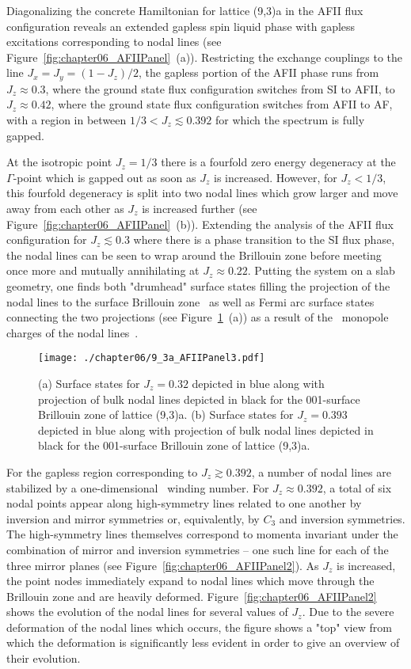Diagonalizing the concrete Hamiltonian for lattice (9,3)a in the AFII flux configuration reveals an extended gapless spin liquid phase with gapless excitations corresponding to nodal lines (see Figure~\ref{fig:chapter06_AFIIPanel}~(a)).
Restricting the exchange couplings to the line $J_x = J_y = (1 - J_z)/2$, the gapless portion of the AFII phase runs from $J_z \approx 0.3$, where the ground state flux configuration switches from SI to AFII, to $J_z \approx 0.42$, where the  ground state flux configuration switches from AFII to AF, with a region in between $1/3 < J_z \lesssim 0.392$ for which the spectrum is fully gapped.

At the isotropic point $J_z = 1/3$ there is a fourfold zero energy degeneracy at the $\Gamma$-point which is gapped out as soon as $J_z$ is increased.
However, for $J_z < 1/3$, this fourfold degeneracy is split into two nodal lines which grow larger and move away from each other as $J_z$ is increased further (see Figure~\ref{fig:chapter06_AFIIPanel}~(b)).
Extending the analysis of the AFII flux configuration for $J_z \lesssim 0.3$ where there is a phase transition to the SI flux phase, the nodal lines can be seen to wrap around the Brillouin zone before meeting once more and mutually annihilating at $J_z \approx 0.22$.
Putting the system on a slab geometry, one finds both "drumhead" surface states filling the projection of the nodal lines to the surface Brillouin zone~\cite{ChenNatComm2015,MullenPRL2015} as well as Fermi arc surface states connecting the two projections (see Figure~\ref{fig:chapter06_AFIIPanel3}~(a)) as a result of the \ZZ~monopole charges of the nodal lines~\cite{GorbarPRB2015a,GorbarPRB2015b}.
%
\begin{figure}[tb]
	\centering
	\texttt{[image: ./chapter06/9\_3a\_AFIIPanel3.pdf]}
	\caption{
		(a) Surface states for $J_z = 0.32$ depicted in blue along with projection of bulk nodal lines depicted in black for the 001-surface Brillouin zone of lattice (9,3)a.
		(b) Surface states for $J_z = 0.393$ depicted in blue along with projection of bulk nodal lines depicted in black for the 001-surface Brillouin zone of lattice (9,3)a.
	}
	\label{fig:chapter06_AFIIPanel3}
\end{figure}
%

For the gapless region corresponding to $J_z \gtrsim 0.392$, a number of nodal lines are stabilized by a one-dimensional \ZZ~winding number.
For $J_z \approx 0.392$, a total of six nodal points appear along high-symmetry lines related to one another by inversion and mirror symmetries or, equivalently, by $C_3$ and inversion symmetries.
The high-symmetry lines themselves correspond to momenta invariant under the combination of mirror and inversion symmetries -- one such line for each of the three mirror planes (see Figure~\ref{fig:chapter06_AFIIPanel2}).
As $J_z$ is increased, the point nodes immediately expand to nodal lines which move through the Brillouin zone and are heavily deformed.
Figure~\ref{fig:chapter06_AFIIPanel2} shows the evolution of the nodal lines for several values of $J_z$.
Due to the severe deformation of the nodal lines which occurs, the figure shows a "top" view from which the deformation is significantly less evident in order to give an overview of their evolution.

